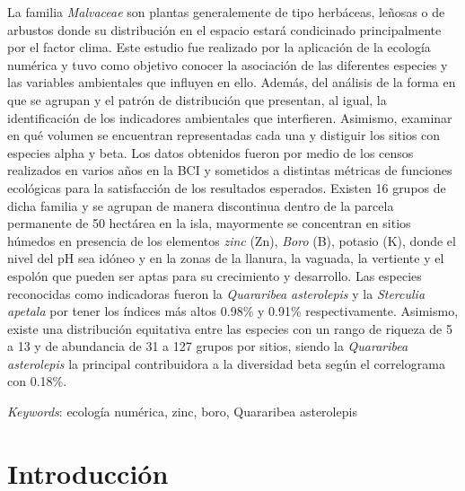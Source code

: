 \documentclass[11pt,]{article}
\renewenvironment{abstract}
 {{%
    \setlength{\leftmargin}{0mm}
    \setlength{\rightmargin}{\leftmargin}%
  }%
  \relax}
 {\endlist}
\begin{document}
\begin{abstract}

    \hbox{\vrule height .2pt width 39.14pc}

    \vskip 8.5pt %

\noindent La familia \emph{Malvaceae} son plantas generalemente de tipo herbáceas,
leñosas o de arbustos donde su distribución en el espacio estará
condicinado principalmente por el factor clima. Este estudio fue
realizado por la aplicación de la ecología numérica y tuvo como objetivo
conocer la asociación de las diferentes especies y las variables
ambientales que influyen en ello. Además, del análisis de la forma en
que se agrupan y el patrón de distribución que presentan, al igual, la
identificación de los indicadores ambientales que interfieren. Asimismo,
examinar en qué volumen se encuentran representadas cada una y distiguir
los sitios con especies alpha y beta. Los datos obtenidos fueron por
medio de los censos realizados en varios años en la BCI y sometidos a
distintas métricas de funciones ecológicas para la satisfacción de los
resultados esperados. Existen 16 grupos de dicha familia y se agrupan de
manera discontinua dentro de la parcela permanente de 50 hectárea en la
isla, mayormente se concentran en sitios húmedos en presencia de los
elementos \emph{zinc} (Zn), \emph{Boro} (B), potasio (K), donde el nivel
del pH sea idóneo y en la zonas de la llanura, la vaguada, la vertiente
y el espolón que pueden ser aptas para su crecimiento y desarrollo. Las
especies reconocidas como indicadoras fueron la \emph{Quararibea
asterolepis} y la \emph{Sterculia apetala} por tener los índices más
altos 0.98\% y 0.91\% respectivamente. Asimismo, existe una distribución
equitativa entre las especies con un rango de riqueza de 5 a 13 y de
abundancia de 31 a 127 grupos por sitios, siendo la \emph{Quararibea
asterolepis} la principal contribuidora a la diversidad beta según el
correlograma con 0.18\%.


\vskip 8.5pt \noindent \emph{Keywords}: ecología numérica, zinc, boro, Quararibea asterolepis \par

    \hbox{\vrule height .2pt width 39.14pc}



\end{abstract}


\vskip 6.5pt


\noindent  \section{Introducción}\label{introducciuxf3n}
\end{document}
